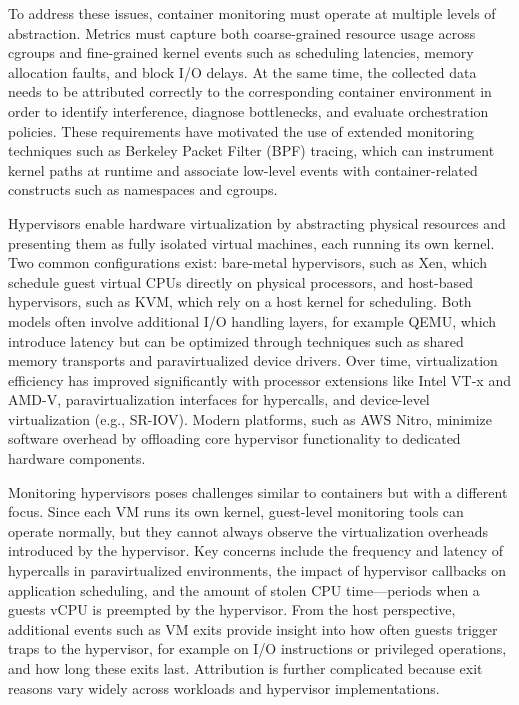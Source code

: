 To address these issues, container monitoring must operate at multiple levels of abstraction. Metrics must capture both coarse-grained resource usage across cgroups and fine-grained kernel events such as scheduling latencies, memory allocation faults, and block I/O delays. At the same time, the collected data needs to be attributed correctly to the corresponding container environment in order to identify interference, diagnose bottlenecks, and evaluate orchestration policies. These requirements have motivated the use of extended monitoring techniques such as Berkeley Packet Filter (BPF) tracing, which can instrument kernel paths at runtime and associate low-level events with container-related constructs such as namespaces and cgroups.

Hypervisors enable hardware virtualization by abstracting physical resources and presenting them as fully isolated virtual machines, each running its own kernel. Two common configurations exist: bare-metal hypervisors, such as Xen, which schedule guest virtual CPUs directly on physical processors, and host-based hypervisors, such as KVM, which rely on a host kernel for scheduling. Both models often involve additional I/O handling layers, for example QEMU, which introduce latency but can be optimized through techniques such as shared memory transports and paravirtualized device drivers. Over time, virtualization efficiency has improved significantly with processor extensions like Intel VT-x and AMD-V, paravirtualization interfaces for hypercalls, and device-level virtualization (e.g., SR-IOV). Modern platforms, such as AWS Nitro, minimize software overhead by offloading core hypervisor functionality to dedicated hardware components.

Monitoring hypervisors poses challenges similar to containers but with a different focus. Since each VM runs its own kernel, guest-level monitoring tools can operate normally, but they cannot always observe the virtualization overheads introduced by the hypervisor. Key concerns include the frequency and latency of hypercalls in paravirtualized environments, the impact of hypervisor callbacks on application scheduling, and the amount of stolen CPU time—periods when a guests vCPU is preempted by the hypervisor. From the host perspective, additional events such as VM exits provide insight into how often guests trigger traps to the hypervisor, for example on I/O instructions or privileged operations, and how long these exits last. Attribution is further complicated because exit reasons vary widely across workloads and hypervisor implementations.

